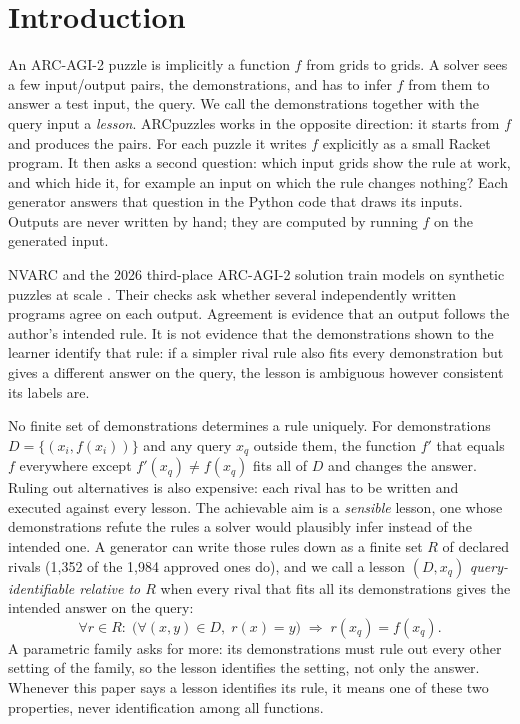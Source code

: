 \documentclass[11pt]{article}
\begin{document}
\section{Introduction}
\label{sec:intro}

An ARC-AGI-2 puzzle is implicitly a function $f$ from grids to grids. A solver
sees a few input/output pairs, the demonstrations, and has to infer $f$ from
them to answer a test input, the query. We call the demonstrations together
with the query input a \emph{lesson}. ARCpuzzles works in the opposite
direction: it starts from $f$ and produces the pairs. For each puzzle it writes
$f$ explicitly as a small Racket program. It then asks a second question: which
input grids show the rule at work, and which hide it, for example an input on
which the rule changes nothing? Each generator answers that question in the
Python code that draws its inputs. Outputs are never written by hand; they are
computed by running $f$ on the generated input.

NVARC and the 2026 third-place ARC-AGI-2 solution train models on synthetic
puzzles at scale \cite{nvarc,darragh2026}. Their checks ask whether several
independently written programs agree on each output. Agreement is evidence that
an output follows the author's intended rule. It is not evidence that the
demonstrations shown to the learner identify that rule: if a simpler rival
rule also fits every demonstration but gives a different answer on the query,
the lesson is ambiguous however consistent its labels are.

No finite set of demonstrations determines a rule uniquely. For demonstrations
$D=\{(x_i,f(x_i))\}$ and any query $x_q$ outside them, the function $f'$ that
equals $f$ everywhere except $f'(x_q)\neq f(x_q)$ fits all of $D$ and changes
the answer. Ruling out alternatives is also expensive: each rival has to be
written and executed against every lesson. The achievable aim is a
\emph{sensible} lesson, one whose demonstrations refute the rules a solver
would plausibly infer instead of the intended one. A generator can write those
rules down as a finite set $R$ of declared rivals (1,352 of the 1,984 approved
ones do), and we call a lesson
$(D,x_q)$ \emph{query-identifiable relative to $R$} when every rival that fits
all its demonstrations gives the intended answer on the query:
\[
  \forall r\in R:\;\big(\forall (x,y)\in D,\; r(x)=y\big)\;\Rightarrow\; r(x_q)=f(x_q).
\]
A parametric family asks for more: its demonstrations must rule out every
other setting of the family, so the lesson identifies the setting, not only
the answer. Whenever this paper says a lesson identifies its rule, it means
one of these two properties, never identification among all functions.
\end{document}
